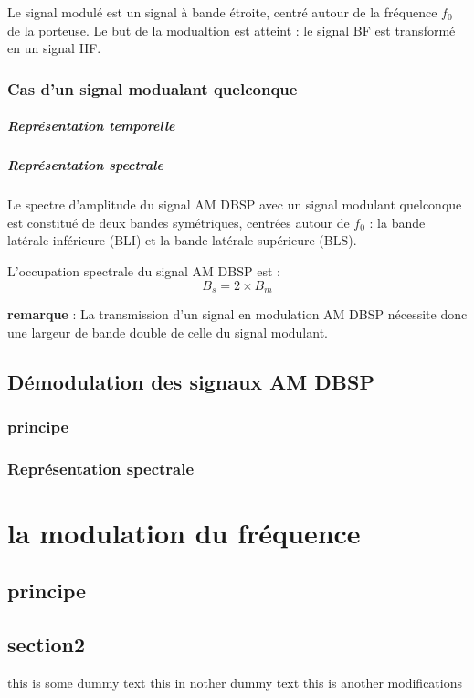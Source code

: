 \documentclass[12pt,a4paper,hidelinks,oneside]{book}
\begin{document}
Le signal modulé est un signal à bande étroite, centré autour de la fréquence $f_{0}$ de la porteuse. Le but
de la modualtion est atteint : le signal BF est transformé en un signal HF.

\subsection{Cas d’un signal modualant quelconque}
\paragraph{Représentation temporelle}
\paragraph{Représentation spectrale }
Le spectre d’amplitude du signal AM DBSP avec un signal modulant quelconque est constitué de deux
bandes symétriques, centrées autour de $f_{0}$ : la bande latérale inférieure (BLI) et la bande latérale
supérieure (BLS).

L’occupation spectrale du signal AM DBSP est :
\begin{equation}
B_{s}=2\times B_{m}
\end{equation}

\noindent\textbf{remarque} : La transmission d’un signal en modulation AM DBSP nécessite donc une largeur de bande double de
celle du signal modulant.

\section{Démodulation des signaux AM DBSP}
\subsection{principe}
\subsection{Représentation spectrale}


\chapter{la modulation du fréquence}
\section{principe}
\section{section2}

this is some dummy text 
this in nother dummy text 
this is another modifications 
\end{document}
